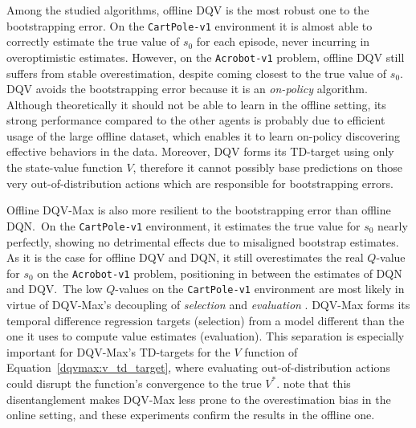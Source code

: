 Among the studied algorithms, offline DQV is the most robust one to
the bootstrapping error. On the \texttt{CartPole-v1} environment it is
almost able to correctly estimate the true value of $s_0$ for each
episode, never incurring in overoptimistic estimates. However, on the
\texttt{Acrobot-v1} problem, offline DQV still suffers from stable
overestimation, despite coming closest to the true value of $s_0$.
DQV avoids the bootstrapping error because it is an \textit{on-policy}
algorithm. Although theoretically it should not be able to learn in
the offline setting, its strong
performance compared to the other agents is probably due to efficient
usage of the large offline dataset, which enables it to learn on-policy
discovering effective behaviors in the data. Moreover, DQV forms its
TD-target using only the state-value function $V$, therefore it cannot
possibly base predictions on those very out-of-distribution actions
which are responsible for bootstrapping errors.

Offline DQV-Max is also more resilient to the bootstrapping error than
offline DQN.\ On the \texttt{CartPole-v1} environment, it estimates
the true value for $s_0$ nearly perfectly, showing no detrimental
effects due to misaligned bootstrap estimates. As it is the case for
offline DQV and DQN, it still overestimates the real $Q$-value for
$s_0$ on the \texttt{Acrobot-v1} problem, positioning in between the
estimates of DQN and DQV.\ The low $Q$-values on the
\texttt{CartPole-v1} environment are most likely in virtue of
DQV-Max's decoupling of \textit{selection} and \textit{evaluation}
\citep{van2016deep}. DQV-Max forms its temporal difference regression
targets (selection) from a model different than the one it uses to
compute value estimates (evaluation). This separation is especially
important for DQV-Max's TD-targets for the $V$ function of
Equation~\ref{dqvmax:v_td_target}, where evaluating
out-of-distribution actions could disrupt the function's
convergence to the true $V^*$. \citet{sabatelli2020deep} note that
this disentanglement makes DQV-Max less prone to the overestimation
bias in the online setting, and these experiments confirm the results
in the offline one.

